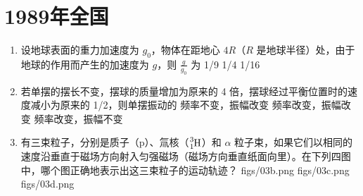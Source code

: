 \documentclass[\gkver]{gaokaozhenti}
\begin{document}
\chapter{1989年全国}

\begin{enumerate}
\item
设地球表面的重力加速度为 $g_{0}$，物体在距地心 $4R$（$R$ 是地球半径）处，由于地球的作用而产生的加速度为 $g$，则 $\frac{g}{g_{0}}$ 为
{1/9}
{1/4}
{1/16}


\item
若单摆的摆长不变，摆球的质量增加为原来的 4 倍，摆球经过平衡位置时的速度减小为原来的 1/2，则单摆振动的
{频率不变，振幅改变}
{频率改变，振幅改变}
{频率改变，振幅不变}


\item
有三束粒子，分别是质子（p）、氚核（$\ce{^{3}_{1}H}$）和 $\alpha$ 粒子束，如果它们以相同的速度沿垂直于磁场方向射入匀强磁场（磁场方向垂直纸面向里）。在下列四图中，哪个图正确地表示出这三束粒子的运动轨迹？
{figs/03b.png}
{figs/03c.png}
{figs/03d.png}



\end{enumerate}
\end{document}
